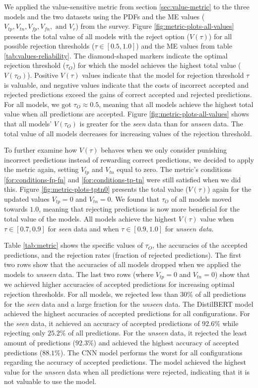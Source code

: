 %
We applied the value-sensitive metric from section \ref{sec:value-metric} to the three models and the two datasets using the PDFs and the ME values ($V_{tp}, V_{tn}, V_{fp}, V_{fn}, \text{ and } V_r$) from the survey.
%
Figure \ref{fig:metric-plots-all-values} presents the total value of all models with the reject option ($V(\tau)$) for all possible rejection thresholds ($\tau \in [0.5, 1.0]$) and the ME values from table \ref{tab:values-reliability}.
%
The diamond-shaped markers indicate the optimal rejection threshold ($\tau_O$) for which the model achieves the highest total value ($V(\tau_O)$).
%
Positive $V(\tau)$ values indicate that the model for rejection threshold $\tau$ is valuable, and negative values indicate that the costs of incorrect accepted and rejected predictions exceed the gains of correct accepted and rejected predictions.
%
For all models, we got $\tau_O \approx 0.5$, meaning that all models achieve the highest total value when all predictions are accepted.
%
Figure \ref{fig:metric-plots-all-values} shows that all models' $V(\tau_O)$ is greater for the \emph{seen} data than for \emph{unseen} data.
%
The total value of all models decreases for increasing values of the rejection threshold.
%

%
To further examine how $V(\tau)$ behaves when we only consider punishing incorrect predictions instead of rewarding correct predictions, we decided to apply the metric again, setting $V_{tp}$ and $V_{tn}$ equal to zero.
%
The metric's conditions \ref{for:conditions-fp-fn} and \ref{for:conditions-tp-tn} were still satisfied when we did this.
%
Figure \ref{fig:metric-plots-tptn0} presents the total value ($V(\tau)$) again for the updated values $V_{tp}=0$ and $V_{tn}=0$.
%
We found that $\tau_O$ of all models moved towards $1.0$, meaning that rejecting predictions is now more beneficial for the total value of the models.
%
All models achieve the highest $V(\tau)$ value when $\tau \in [0.7, 0.9]$ for \emph{seen} data and when $\tau \in [0.9, 1.0]$ for \emph{unseen data}.
%

%
Table \ref{tab:metric} shows the specific values of $\tau_O$, the accuracies of the accepted predictions, and the rejection rates (fraction of rejected predictions).
%
The first two rows show that the accuracies of all models dropped when we applied the models to \emph{unseen} data.
%
The last two rows (where $V_{tp}=0$ and $V_{tn}=0$) show that we achieved higher accuracies of accepted predictions for increasing optimal rejection thresholds.
%
For all models, we rejected less than 30\% of all predictions for the \emph{seen} data and a large fraction for the \emph{unseen} data.
%
The DistilBERT model achieved the highest accuracies of accepted predictions for all configurations.
%
For the \emph{seen} data, it achieved an accuracy of accepted predictions of $92.6\%$ while rejecting only $25.2\%$ of all predictions.
%
For the \emph{unseen} data, it rejected the least amount of predictions ($92.3\%$) and achieved the highest accuracy of accepted predictions ($88.1\%$).
%
The CNN model performs the worst for all configurations regarding the accuracy of accepted predictions.
%
The model achieved the highest value for the \emph{unseen} data when all predictions were rejected, indicating that it is not valuable to use the model.

